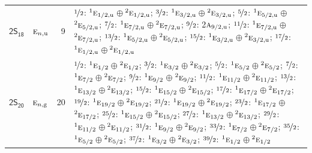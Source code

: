 \documentclass[10pt,a4paper]{article}
\numberwithin{equation}{section}
\newcommand{\grp}[1]{\mathsf{#1}}
\newcommand{\irr}[1]{\text{\normalfont\scshape #1}}
\newcommand{\conjpair}[1]{{}^{#1}}
\newcommand{\ptag}[1]{\mathrm{#1}}
\newlength{\fillwidth}\newlength{\cellwidth}\newlength{\colwidth}
\begin{document}
{\begin{longtable}{@{}llr>{\RaggedRight\arraybackslash}p{\fillwidth}@{}}
\href{2S18.pdf}{$\grp{2S_{18}}$} & $\irr{e}_{n,\ptag{u}}$ & 9 & $\nicefrac{1}{2}$: $\conjpair{1}\irr{e}_{1/2,\ptag{u}}$${}\oplus{}$$\conjpair{2}\irr{e}_{1/2,\ptag{u}}$; $\nicefrac{3}{2}$: $\conjpair{1}\irr{e}_{3/2,\ptag{u}}$${}\oplus{}$$\conjpair{2}\irr{e}_{3/2,\ptag{u}}$; $\nicefrac{5}{2}$: $\conjpair{1}\irr{e}_{5/2,\ptag{u}}$${}\oplus{}$$\conjpair{2}\irr{e}_{5/2,\ptag{u}}$; $\nicefrac{7}{2}$: $\conjpair{1}\irr{e}_{7/2,\ptag{u}}$${}\oplus{}$$\conjpair{2}\irr{e}_{7/2,\ptag{u}}$; $\nicefrac{9}{2}$: 2$\irr{a}_{9/2,\ptag{u}}$; $\nicefrac{11}{2}$: $\conjpair{1}\irr{e}_{7/2,\ptag{u}}$${}\oplus{}$$\conjpair{2}\irr{e}_{7/2,\ptag{u}}$; $\nicefrac{13}{2}$: $\conjpair{1}\irr{e}_{5/2,\ptag{u}}$${}\oplus{}$$\conjpair{2}\irr{e}_{5/2,\ptag{u}}$; $\nicefrac{15}{2}$: $\conjpair{1}\irr{e}_{3/2,\ptag{u}}$${}\oplus{}$$\conjpair{2}\irr{e}_{3/2,\ptag{u}}$; $\nicefrac{17}{2}$: $\conjpair{1}\irr{e}_{1/2,\ptag{u}}$${}\oplus{}$$\conjpair{2}\irr{e}_{1/2,\ptag{u}}$\\
\href{2S20.pdf}{$\grp{2S_{20}}$} & $\irr{e}_{n,\ptag{g}}$ & 20 & $\nicefrac{1}{2}$: $\conjpair{1}\irr{e}_{1/2}$${}\oplus{}$$\conjpair{2}\irr{e}_{1/2}$; $\nicefrac{3}{2}$: $\conjpair{1}\irr{e}_{3/2}$${}\oplus{}$$\conjpair{2}\irr{e}_{3/2}$; $\nicefrac{5}{2}$: $\conjpair{1}\irr{e}_{5/2}$${}\oplus{}$$\conjpair{2}\irr{e}_{5/2}$; $\nicefrac{7}{2}$: $\conjpair{1}\irr{e}_{7/2}$${}\oplus{}$$\conjpair{2}\irr{e}_{7/2}$; $\nicefrac{9}{2}$: $\conjpair{1}\irr{e}_{9/2}$${}\oplus{}$$\conjpair{2}\irr{e}_{9/2}$; $\nicefrac{11}{2}$: $\conjpair{1}\irr{e}_{11/2}$${}\oplus{}$$\conjpair{2}\irr{e}_{11/2}$; $\nicefrac{13}{2}$: $\conjpair{1}\irr{e}_{13/2}$${}\oplus{}$$\conjpair{2}\irr{e}_{13/2}$; $\nicefrac{15}{2}$: $\conjpair{1}\irr{e}_{15/2}$${}\oplus{}$$\conjpair{2}\irr{e}_{15/2}$; $\nicefrac{17}{2}$: $\conjpair{1}\irr{e}_{17/2}$${}\oplus{}$$\conjpair{2}\irr{e}_{17/2}$; $\nicefrac{19}{2}$: $\conjpair{1}\irr{e}_{19/2}$${}\oplus{}$$\conjpair{2}\irr{e}_{19/2}$; $\nicefrac{21}{2}$: $\conjpair{1}\irr{e}_{19/2}$${}\oplus{}$$\conjpair{2}\irr{e}_{19/2}$; $\nicefrac{23}{2}$: $\conjpair{1}\irr{e}_{17/2}$${}\oplus{}$$\conjpair{2}\irr{e}_{17/2}$; $\nicefrac{25}{2}$: $\conjpair{1}\irr{e}_{15/2}$${}\oplus{}$$\conjpair{2}\irr{e}_{15/2}$; $\nicefrac{27}{2}$: $\conjpair{1}\irr{e}_{13/2}$${}\oplus{}$$\conjpair{2}\irr{e}_{13/2}$; $\nicefrac{29}{2}$: $\conjpair{1}\irr{e}_{11/2}$${}\oplus{}$$\conjpair{2}\irr{e}_{11/2}$; $\nicefrac{31}{2}$: $\conjpair{1}\irr{e}_{9/2}$${}\oplus{}$$\conjpair{2}\irr{e}_{9/2}$; $\nicefrac{33}{2}$: $\conjpair{1}\irr{e}_{7/2}$${}\oplus{}$$\conjpair{2}\irr{e}_{7/2}$; $\nicefrac{35}{2}$: $\conjpair{1}\irr{e}_{5/2}$${}\oplus{}$$\conjpair{2}\irr{e}_{5/2}$; $\nicefrac{37}{2}$: $\conjpair{1}\irr{e}_{3/2}$${}\oplus{}$$\conjpair{2}\irr{e}_{3/2}$; $\nicefrac{39}{2}$: $\conjpair{1}\irr{e}_{1/2}$${}\oplus{}$$\conjpair{2}\irr{e}_{1/2}$\\

\end{longtable}}
\end{document}
